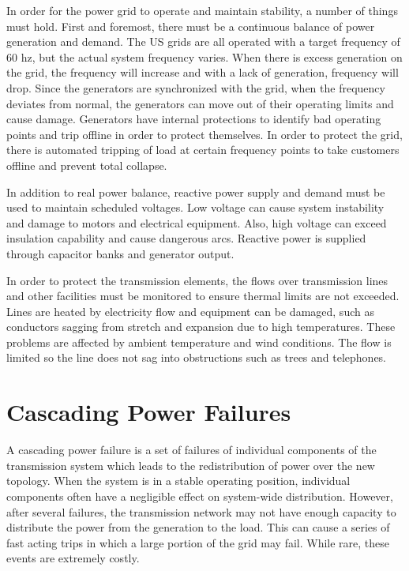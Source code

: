 In order for the power grid to operate and maintain stability, a number of things must hold.  First and foremost, there must be a continuous balance of power generation and demand.  The US grids are all operated with a target frequency of 60 hz, but the actual system frequency varies.  When there is excess generation on the grid, the frequency will increase and with a lack of generation, frequency will drop.  Since the generators are synchronized with the grid, when the frequency deviates from normal, the generators can move out of their operating limits and cause damage.  Generators have internal protections to identify bad operating points and trip offline in order to protect themselves.  In order to protect the grid, there is automated tripping of load at certain frequency points to take customers offline and prevent total collapse.  

In addition to real power balance, reactive power supply and demand must be used to maintain scheduled voltages.  Low voltage can cause system instability and damage to motors and electrical equipment.  Also, high voltage can exceed insulation capability and cause dangerous arcs.  Reactive power is supplied through capacitor banks and generator output.

In order to protect the transmission elements, the flows over transmission lines and other facilities must be monitored to ensure thermal limits are not exceeded.  Lines are heated by electricity flow and equipment can be damaged, such as conductors sagging from stretch and expansion due to high temperatures.  These problems are affected by ambient temperature and wind conditions.  The flow is limited so the line does not sag into obstructions such as trees and telephones.



\section{Cascading Power Failures}
A cascading power failure is a set of failures of individual components of the transmission system which leads to the redistribution of power over the new topology.
 When the system is in a stable operating position, individual components often have a negligible effect on system-wide distribution.  However, after several failures, the transmission network may not have enough capacity to distribute the power from the generation to the load.  This can cause a series of fast acting trips in which a large portion of the grid may fail.  While rare, these events are extremely costly.


